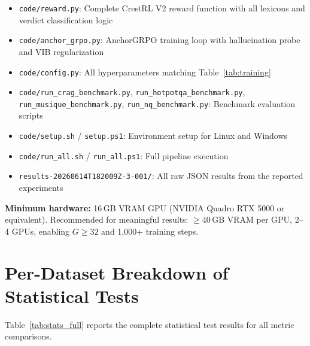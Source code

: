 \documentclass[11pt]{article}
\begin{document}
\begin{itemize}
    \item \texttt{code/reward.py}: Complete CrestRL V2 reward function with all lexicons and verdict classification logic
    \item \texttt{code/anchor\_grpo.py}: AnchorGRPO training loop with hallucination probe and VIB regularization
    \item \texttt{code/config.py}: All hyperparameters matching Table~\ref{tab:training}
    \item \texttt{code/run\_crag\_benchmark.py}, \texttt{run\_hotpotqa\_benchmark.py}, \texttt{run\_musique\_benchmark.py}, \texttt{run\_nq\_benchmark.py}: Benchmark evaluation scripts
    \item \texttt{code/setup.sh} / \texttt{setup.ps1}: Environment setup for Linux and Windows
    \item \texttt{code/run\_all.sh} / \texttt{run\_all.ps1}: Full pipeline execution
    \item \texttt{results-20260614T182009Z-3-001/}: All raw JSON results from the reported experiments
\end{itemize}

\textbf{Minimum hardware:} 16\,GB VRAM GPU (NVIDIA Quadro RTX 5000 or equivalent). Recommended for meaningful results: $\geq$40\,GB VRAM per GPU, 2--4 GPUs, enabling $G\geq32$ and 1{,}000+ training steps.

\section{Per-Dataset Breakdown of Statistical Tests}
\label{app:stats}

Table~\ref{tab:stats_full} reports the complete statistical test results for all metric comparisons.
\end{document}
